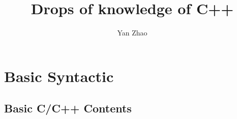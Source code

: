 \documentclass[a4paper,11pt,twoside]{book}
\begin{document}
\title{Drops of knowledge of C++}
\author{Yan Zhao}
\date{}\maketitle

\setcounter{secnumdepth}{4}
\setcounter{tocdepth}{4}
\tableofcontents


\chapter{Basic Syntactic}

\section{Basic C/C++ Contents}
\end{document}
